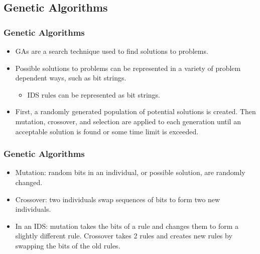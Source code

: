 \documentclass{beamer}
\newcommand{\linespace}{\vskip 0.25cm}
\begin{document}
\subsection{Genetic Algorithms}
\begin{frame}
  \frametitle{Genetic Algorithms}
	\begin{itemize}
		\item GAs are a search technique used to find solutions to problems.
        \item Possible solutions to problems can be represented in a variety of problem dependent ways, such as bit strings.
        
        \begin{itemize}
        	\item IDS rules can be represented as bit strings.
        \end{itemize}
        
        \linespace
        \item First, a randomly generated population of potential solutions is created. Then mutation, crossover, and selection are applied to each generation until an acceptable solution is found or some time limit is exceeded.
	\end{itemize}
\end{frame}


\begin{frame}
  \frametitle{Genetic Algorithms}
	\begin{itemize}
        \item Mutation: random bits in an individual, or possible solution, are randomly changed.
        \item Crossover: two individuals swap sequences of bits to form two new individuals.
        
        \linespace
        \linespace
        
       	\item In an IDS: mutation takes the bits of a rule and changes them to form a slightly different rule. Crossover takes 2 rules and creates new rules by swapping the bits of the old rules.

	\end{itemize}
\end{frame}
\end{document}
